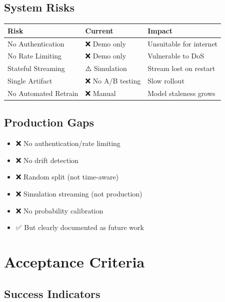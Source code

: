 \documentclass[12pt,a4paper]{article}
\begin{document}
\subsection{System Risks}

\begin{table}[H]
\centering
\small
\begin{tabular}{|l|l|l|}
\hline
\textbf{Risk} & \textbf{Current} & \textbf{Impact} \\
\hline
No Authentication & ❌ Demo only & Unsuitable for internet \\
No Rate Limiting & ❌ Demo only & Vulnerable to DoS \\
Stateful Streaming & ⚠️ Simulation & Stream lost on restart \\
Single Artifact & ❌ No A/B testing & Slow rollout \\
No Automated Retrain & ❌ Manual & Model staleness grows \\
\hline
\end{tabular}
\end{table}

\subsection{Production Gaps}

\begin{itemize}
    \item ❌ No authentication/rate limiting
    \item ❌ No drift detection
    \item ❌ Random split (not time-aware)
    \item ❌ Simulation streaming (not production)
    \item ❌ No probability calibration
    \item ✅ But clearly documented as future work
\end{itemize}

\section{Acceptance Criteria}

\subsection{Success Indicators}
\end{document}
